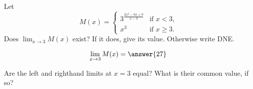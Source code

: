 \documentclass{ximera}
\author{Steven Gubkin}
\begin{document}
\begin{exercise}

Let
\[
M(x) = \begin{cases} 3^{\frac{2x^2 - 9x+9}{x-3}} &\text{if $x<3$,} \\
  x^3 &\text{if $x \geq 3$.}
\end{cases}
\]
Does $\lim_{x \to 3} M(x)$ exist?  If it does, give its value.
Otherwise write DNE.
\begin{prompt}
\[
\lim_{x \to  3} M(x) = \answer{27}
\]
\end{prompt}
\begin{hint}
  Are the left and righthand limits at $x=3$ equal? What is their common value, if so?
\end{hint}
\end{exercise}
\end{document}
